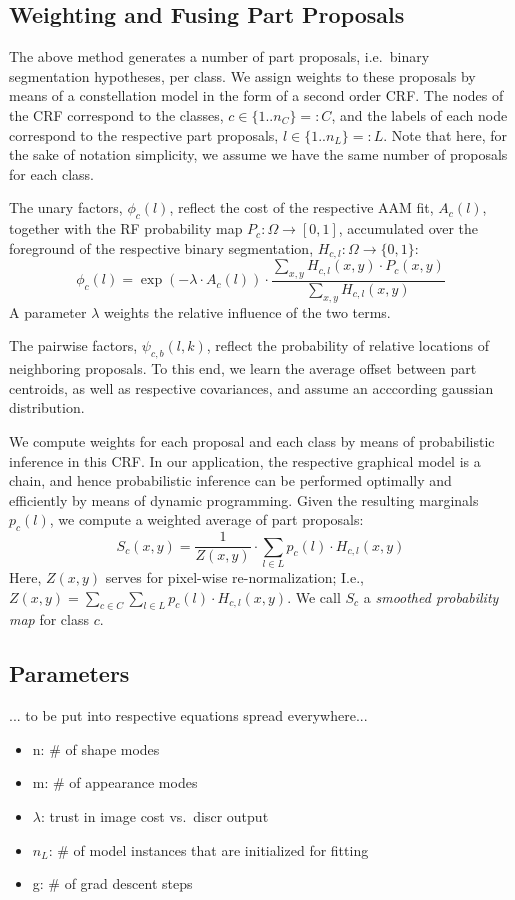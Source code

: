 \documentclass[10pt,twocolumn,letterpaper]{article}
\begin{document}
\subsection{Weighting and Fusing Part Proposals}
\label{subsec:weightsAndFusion}

The above method generates a number of part proposals, i.e.\ binary segmentation hypotheses, per class. 
%
We assign weights to these proposals by means of a constellation model in the form of a second order CRF. 
%
The nodes of the CRF correspond to the classes, $c\in \{1..n_C\}=:C$, and the labels of each node correspond to the respective part proposals, $l\in \{1..n_L\}=:L$. 
Note that here, for the sake of notation simplicity, we assume we have the same number of proposals for each class. 

The unary factors, $\phi_c(l)$, reflect the cost of the respective AAM fit, $A_c(l)$, together with the RF probability map $P_c:\Omega\rightarrow [ 0,1 ]$, accumulated over the foreground of the respective binary segmentation, $H_{c,l}: \Omega\rightarrow \{0,1\}$: 
\begin{equation}
\phi_c(l) = \exp{(-\lambda\cdot A_c(l))} \cdot \frac{\sum_{x,y} H_{c,l}(x,y)\cdot P_c(x,y)}{\sum_{x,y} H_{c,l}(x,y)}
\label{eq:unaries}
\end{equation}
A parameter $\lambda$ weights the relative influence of the two terms. 

The pairwise factors, $\psi_{c,b}(l,k)$, reflect the probability of relative locations of neighboring proposals. To this end, we learn the average offset between part centroids, as well as respective covariances, and assume an acccording gaussian distribution. 

We compute weights for each proposal and each class by means of probabilistic inference in this CRF. In our application, the respective graphical model is a chain, and hence probabilistic inference can be performed optimally and efficiently by means of dynamic programming. 
%
Given the resulting marginals $p_c(l)$, we compute a weighted average of part proposals: 
\[ S_c(x,y) = \frac{1}{Z(x,y)} \cdot \sum_{l\in L} p_c(l)\cdot H_{c,l}(x,y) \]
Here, $Z(x,y)$ serves for pixel-wise re-normalization; I.e., $Z(x,y)=\sum_{c\in C}\sum_{l\in L} p_c(l)\cdot H_{c,l}(x,y)$.
%
We call $S_c$ a \emph{smoothed probability map} for class $c$. 

\subsection{Parameters}
... to be put into respective equations spread everywhere...
\begin{itemize}
\item n: \# of shape modes
\item m: \# of appearance modes
\item $\lambda$: trust in image cost vs.\ discr output
\item $n_L$: \# of model instances that are initialized for fitting
\item g: \# of grad descent steps
\end{itemize}
\end{document}
